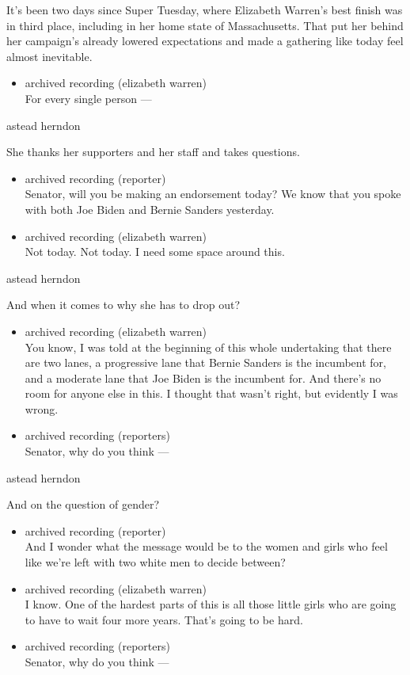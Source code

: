 It's been two days since Super Tuesday, where Elizabeth Warren's best
finish was in third place, including in her home state of Massachusetts.
That put her behind her campaign's already lowered expectations and made
a gathering like today feel almost inevitable.

\begin{itemize}
\tightlist
\item
  archived recording (elizabeth warren)\\
  For every single person ---
\end{itemize}

astead herndon

She thanks her supporters and her staff and takes questions.

\begin{itemize}
\item
  archived recording (reporter)\\
  Senator, will you be making an endorsement today? We know that you
  spoke with both Joe Biden and Bernie Sanders yesterday.
\item
  archived recording (elizabeth warren)\\
  Not today. Not today. I need some space around this.
\end{itemize}

astead herndon

And when it comes to why she has to drop out?

\begin{itemize}
\item
  archived recording (elizabeth warren)\\
  You know, I was told at the beginning of this whole undertaking that
  there are two lanes, a progressive lane that Bernie Sanders is the
  incumbent for, and a moderate lane that Joe Biden is the incumbent
  for. And there's no room for anyone else in this. I thought that
  wasn't right, but evidently I was wrong.
\item
  archived recording (reporters)\\
  Senator, why do you think ---
\end{itemize}

astead herndon

And on the question of gender?

\begin{itemize}
\item
  archived recording (reporter)\\
  And I wonder what the message would be to the women and girls who feel
  like we're left with two white men to decide between?
\item
  archived recording (elizabeth warren)\\
  I know. One of the hardest parts of this is all those little girls who
  are going to have to wait four more years. That's going to be hard.
\item
  archived recording (reporters)\\
  Senator, why do you think ---
\end{itemize}

